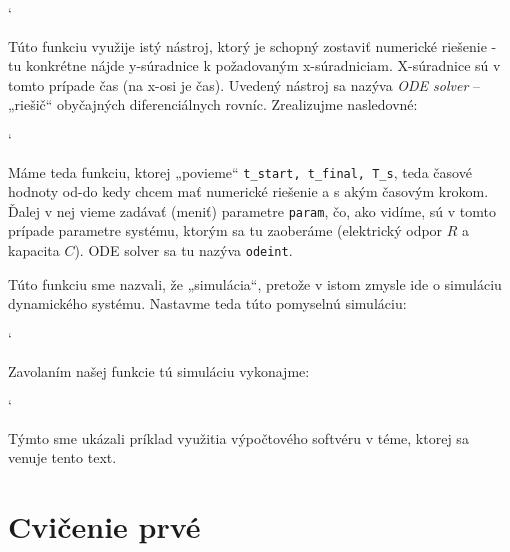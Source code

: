 \documentclass[a4paper, 10pt, ]{article}
\begin{document}
{\catcode`

}

Túto funkciu využije istý nástroj, ktorý je schopný zostaviť numerické riešenie - tu konkrétne nájde y-súradnice k požadovaným x-súradniciam. X-súradnice sú v tomto prípade čas (na x-osi je čas). Uvedený nástroj sa nazýva \emph{ODE solver} -- „riešič“ obyčajných diferenciálnych rovníc. Zrealizujme nasledovné:

{\catcode`

}

Máme teda funkciu, ktorej „povieme“ \lstinline|t_start, t_final, T_s|, teda časové hodnoty od-do kedy chcem mať numerické riešenie a s akým časovým krokom. Ďalej v nej vieme zadávať (meniť) parametre \lstinline|param|, čo, ako vidíme, sú v tomto prípade parametre systému, ktorým sa tu zaoberáme (elektrický odpor $R$ a kapacita $C$). ODE solver sa tu nazýva \lstinline|odeint|.

Túto funkciu sme nazvali, že „simulácia“, pretože v istom zmysle ide o simuláciu dynamického systému. Nastavme teda túto pomyselnú simuláciu:

{\catcode`

}

Zavolaním našej funkcie tú simuláciu vykonajme:

{\catcode`

}

Týmto sme ukázali príklad využitia výpočtového softvéru v téme, ktorej sa venuje tento text.














\section{Cvičenie prvé}
\end{document}
